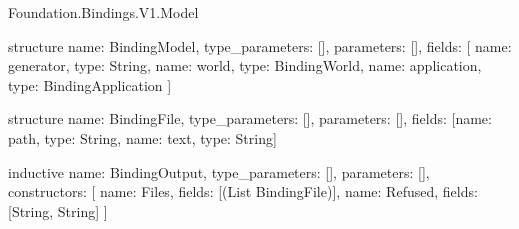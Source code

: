 \begin{lexlean}{Foundation.Bindings.V1.Model}
\begin{semanticmodule}
structure{
  name: BindingModel,
  type_parameters: [],
  parameters: [],
  fields: [
    {name: generator, type: String},
    {name: world, type: BindingWorld},
    {name: application, type: BindingApplication}
  ]
}

structure{
  name: BindingFile,
  type_parameters: [],
  parameters: [],
  fields: [{name: path, type: String}, {name: text, type: String}]
}

inductive{
  name: BindingOutput,
  type_parameters: [],
  parameters: [],
  constructors: [
    {name: Files, fields: [(List BindingFile)]},
    {name: Refused, fields: [String, String]}
  ]
}
\end{semanticmodule}
\end{lexlean}
